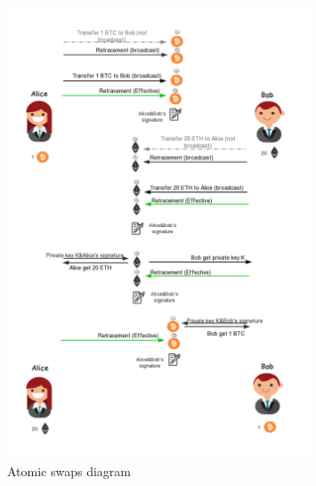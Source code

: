    \begin{figure}[H]
    \includegraphics[width=0.8\textwidth]{./figures/atomic_swaps.png}
    \centering
    \caption{Atomic swaps diagram}%
    \centering
    \label{fig:atomic}
    \end{figure}
